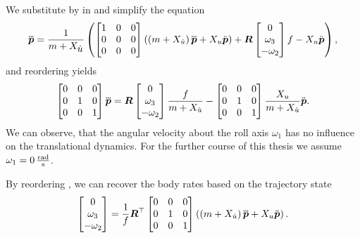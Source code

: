We substitute \fp by  in  and simplify the equation
\begin{equation}
	\mbox{$\dddot{\bm{p}}$} = 
	\frac{1}{m + X_{\mbox{$\dot{u}$}}}
	\left(
		\begin{bmatrix}
			1 & 0 & 0 \\
			0 & 0 & 0 \\
			0 & 0 & 0
		\end{bmatrix}
		\left(
			\left(m + X_{\dot{u}}\right)
			\mbox{$\dddot{\bm{p}}$}
			+ X_u \mbox{$\ddot{\bm{p}}$}
		\right)
		+
		\mbox{$\bm{R}$}
		\begin{bmatrix}
			0 \\
			\omega_3 \\
			-\omega_2
		\end{bmatrix}
		f
		- X_u \mbox{$\ddot{\bm{p}}$}
	\right),
\end{equation}
and reordering yields
\begin{equation}
	\label{eq:jerk-vs-bodyrates}
	\begin{bmatrix}
		0 & 0 & 0\\
		0 & 1 & 0\\
		0 & 0 & 1
	\end{bmatrix}
	\mbox{$\dddot{\bm{p}}$} = 
	\mbox{$\bm{R}$}
	\begin{bmatrix}
		0 \\
		\omega_3 \\
		- \omega_2
	\end{bmatrix}
	\frac{f}{m + X_{\dot{u}}}
	-
	\begin{bmatrix}
		0 & 0 & 0 \\
		0 & 1 & 0 \\
		0 & 0 & 1
	\end{bmatrix}
	\frac{X_u}{m + X_{\dot{u}}}
	\mbox{$\ddot{\bm{p}}$}
	.
\end{equation}
We can observe, that the angular velocity about the roll axis $\omega_1$ has no influence on the translational dynamics. For the further course of this thesis we assume $\omega_1 = \unit[0]{\frac{rad}{s}}$.

By reordering , we can recover the body rates based on the trajectory state
\begin{equation}
	\label{eq:body-rate-relation}
	\begin{bmatrix}
		0 \\
		\omega_3 \\
		- \omega_2
	\end{bmatrix}
	=
	\frac{1}{f}
	\mbox{$\bm{R}$}^\top
	\begin{bmatrix}
		0 & 0 & 0 \\
		0 & 1 & 0 \\
		0 & 0 & 1
	\end{bmatrix}
	\left(
		\left(
			m + X_{\dot{u}}
		\right)
		\mbox{$\dddot{\bm{p}}$}
		+ X_u \mbox{$\ddot{\bm{p}}$}
	\right)
	.
\end{equation}


